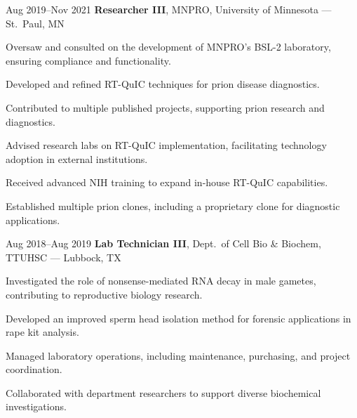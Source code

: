\documentclass{resume}
\begin{document}
        \begin{twocolentry}{Aug 2019--Nov 2021}
            \textbf{Researcher III}, MNPRO, University of Minnesota --- St.\ Paul, MN
        \end{twocolentry}
        \begin{onecolentry}
            \begin{highlights}
                \item Oversaw and consulted on the development of MNPRO's BSL-2 laboratory, ensuring compliance and functionality.
                \item Developed and refined RT-QuIC techniques for prion disease diagnostics.
                \item Contributed to multiple published projects, supporting prion research and diagnostics.
                \item Advised research labs on RT-QuIC implementation, facilitating technology adoption in external institutions.
                \item Received advanced NIH training to expand in-house RT-QuIC capabilities.
                \item Established multiple prion clones, including a proprietary clone for diagnostic applications.
            \end{highlights}
        \end{onecolentry}

        \begin{twocolentry}{Aug 2018--Aug 2019}
            \textbf{Lab Technician III}, Dept.\ of Cell Bio \& Biochem, TTUHSC --- Lubbock, TX
        \end{twocolentry}
        \begin{onecolentry}
            \begin{highlights}
                \item Investigated the role of nonsense-mediated RNA decay in male gametes, contributing to reproductive biology research.
                \item Developed an improved sperm head isolation method for forensic applications in rape kit analysis.
                \item Managed laboratory operations, including maintenance, purchasing, and project coordination.
                \item Collaborated with department researchers to support diverse biochemical investigations.
            \end{highlights}
        \end{onecolentry}
\end{document}
